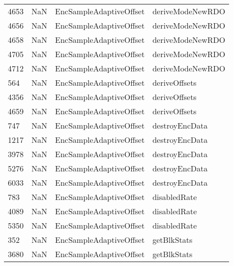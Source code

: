 \begin{tabular}{llll}
4653 &                   NaN &    EncSampleAdaptiveOffset &                          deriveModeNewRDO \\
4656 &                   NaN &    EncSampleAdaptiveOffset &                          deriveModeNewRDO \\
4658 &                   NaN &    EncSampleAdaptiveOffset &                          deriveModeNewRDO \\
4705 &                   NaN &    EncSampleAdaptiveOffset &                          deriveModeNewRDO \\
4712 &                   NaN &    EncSampleAdaptiveOffset &                          deriveModeNewRDO \\
564  &                   NaN &    EncSampleAdaptiveOffset &                             deriveOffsets \\
4356 &                   NaN &    EncSampleAdaptiveOffset &                             deriveOffsets \\
4659 &                   NaN &    EncSampleAdaptiveOffset &                             deriveOffsets \\
747  &                   NaN &    EncSampleAdaptiveOffset &                            destroyEncData \\
1217 &                   NaN &    EncSampleAdaptiveOffset &                            destroyEncData \\
3978 &                   NaN &    EncSampleAdaptiveOffset &                            destroyEncData \\
5276 &                   NaN &    EncSampleAdaptiveOffset &                            destroyEncData \\
6033 &                   NaN &    EncSampleAdaptiveOffset &                            destroyEncData \\
783  &                   NaN &    EncSampleAdaptiveOffset &                              disabledRate \\
4089 &                   NaN &    EncSampleAdaptiveOffset &                              disabledRate \\
5350 &                   NaN &    EncSampleAdaptiveOffset &                              disabledRate \\
352  &                   NaN &    EncSampleAdaptiveOffset &                               getBlkStats \\
3680 &                   NaN &    EncSampleAdaptiveOffset &                               getBlkStats \\

\end{tabular}
